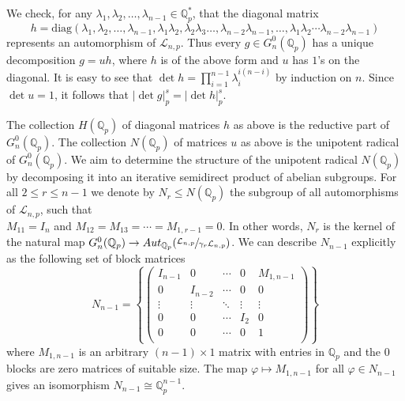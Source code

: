 \documentclass{article}
\begin{document}
We check, for any $\lambda_{1},\lambda_{2},\dots,\lambda_{n-1}\in\mathbb{Q}_{p}^{\ast}$, that the diagonal matrix \[h=\mathrm{diag}(\lambda_{1},\lambda_{2},\dots,\lambda_{n-1},\lambda_{1}\lambda_{2},\lambda_{2}\lambda_{3}\dots,\lambda_{n-2}\lambda_{n-1},\dots,\lambda_{1}\lambda_{2}\cdots\lambda_{n-2}\lambda_{n-1})\]
represents an automorphism of $\mathcal{L}_{n,p}$. Thus every $g\in{G_{n}^{0}(\mathbb{Q}_{p})}$ has a unique decomposition $g=uh$, where $h$ is of the above form and $u$ has $1$'s on the diagonal. It is easy to see that $\det{h}=\prod_{i=1}^{n-1}\lambda_i^{i(n-i)}$ by induction on $n$. Since $\det{u}=1$, it follows that $|\det{g}|_{p}^{s}=|\det{h}|_{p}^{s}$.

The collection $H(\mathbb{Q}_{p})$ of diagonal matrices $h$ as above is the reductive part of $G_{n}^{0}(\mathbb{Q}_{p})$. The collection $N(\mathbb{Q}_{p})$ of matrices $u$ as above is the unipotent radical of $G_{n}^{0}(\mathbb{Q}_{p})$. We aim to determine the structure of the unipotent radical $N(\mathbb{Q}_p)$ by decomposing it into an iterative semidirect product of abelian subgroups.
For all $2\leq{r}\leq{n-1}$ we denote by $N_{r}\leq{N(\mathbb{Q}_{p})}$ the subgroup of all automorphisms of $\mathcal{L}_{n,p}$, such that\\ $M_{11}=I_{n}$ and $M_{12}=M_{13}=\cdots=M_{1,r-1}=0$. In other words, $N_{r}$ is the kernel of the natural map $G_{n}^{0}(\mathbb{Q}_{p})\rightarrow{Aut_{\mathbb{Q}_{p}}(\sfrac{\mathcal{L}_{n,p}}{\gamma_{r}\mathcal{L}_{n,p}})}$. We can describe $N_{n-1}$ explicitly as the following set of block matrices \[
N_{n-1}=\left\{\begin{pmatrix}
I_{n-1} & 0 & \cdots & 0 & M_{1,n-1}\\
0 & I_{n-2} & \cdots & 0 & 0\\
\vdots & \vdots & \ddots & \vdots & \vdots\\
0 & 0 & \cdots & I_{2} & 0\\
0 & 0 & \cdots & 0 & 1\\
\end{pmatrix}\right\}
\]
where $M_{1,n-1}$ is an arbitrary $(n-1)\times{1}$ matrix with entries in $\mathbb{Q}_{p}$ and the $0$ blocks are zero matrices of suitable size. The map $\varphi\mapsto{M_{1,n-1}}$ for all $\varphi\in{N_{n-1}}$ gives an isomorphism $N_{n-1}\cong\mathbb{Q}_{p}^{n-1}$.
\end{document}
